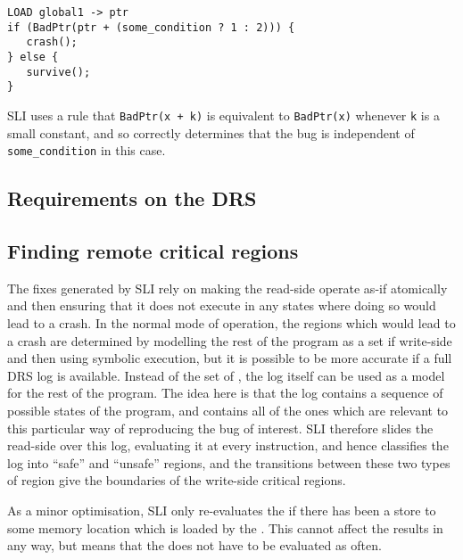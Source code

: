\begin{verbatim}
LOAD global1 -> ptr
if (BadPtr(ptr + (some_condition ? 1 : 2))) {
   crash();
} else {
   survive();
}
\end{verbatim}

SLI uses a rule that \verb|BadPtr(x + k)| is equivalent to \verb|BadPtr(x)| whenever \verb|k| is a small constant, and so correctly determines that the bug is independent of \verb|some_condition| in this case.


\subsection{Requirements on the DRS}

\subsection{Finding remote critical regions}

The fixes generated by SLI rely on making the read-side \StateMachine operate as-if atomically and then ensuring that it does not execute in any states where doing so would lead to a crash.
In the normal mode of operation, the regions which would lead to a crash are determined by modelling the rest of the program as a set if write-side \StateMachines and then using symbolic execution, but it is possible to be more accurate if a full DRS log is available.
Instead of the set of \StateMachines, the log itself can be used as a model for the rest of the program.
The idea here is that the log contains a sequence of possible states of the program, and contains all of the ones which are relevant to this particular way of reproducing the bug of interest.
SLI therefore slides the read-side \StateMachine over this log, evaluating it at every instruction, and hence classifies the log into ``safe'' and ``unsafe'' regions, and the transitions between these two types of region give the boundaries of the write-side critical regions.

As a minor optimisation, SLI only re-evaluates the \StateMachine if there has been a store to some memory location which is loaded by the \StateMachine.
This cannot affect the results in any way, but means that the \StateMachine does not have to be evaluated as often.

